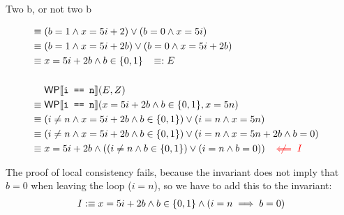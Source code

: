 \documentclass[
  english
]{tumteaching}
\begin{document}
\begin{assignment}[L]{Two b, or not two b}
\begin{solution}
\begin{align*}
			\equiv&\;(b = 1 \land x = 5i + 2) \lor (b = 0 \land x = 5i)\\
			\equiv&\;(b = 1 \land x = 5i + 2b) \lor (b = 0 \land x = 5i + 2b)\\
			\equiv&\;x = 5i + 2b \land b \in \{ 0, 1 \} \;\;\; \equivdef E\\
			&&\\
			&\;\WP{i == n}(E, Z)\\
			\equiv&\;\WP{i == n}(x = 5i + 2b \land b \in \{ 0, 1 \}, x = 5n)\\
			\equiv&\;(i \neq n \land x = 5i + 2b \land b \in \{ 0, 1 \}) \lor (i = n \land x = 5n)\\
			\equiv&\;(i \neq n \land x = 5i + 2b \land b \in \{ 0, 1\}) \lor (i = n \land x = 5n + 2b \land b = 0)\\
			\equiv&\;x = 5i + 2b \land ((i \neq n \land b \in \{ 0, 1 \}) \lor (i = n \land b = 0)) \;\;\; \textcolor{red}{\centernot \impliedby I}\\
		\end{align*}

		The proof of local consistency fails, because the invariant does not imply that $b = 0$ when leaving the loop ($i = n$), so we have to add this to the invariant:
		\begin{align*}
			I :\equiv x = 5i + 2b \land b \in \{ 0, 1 \} \land (i = n \implies b = 0)
		\end{align*}


\end{solution}
\end{assignment}
\end{document}
